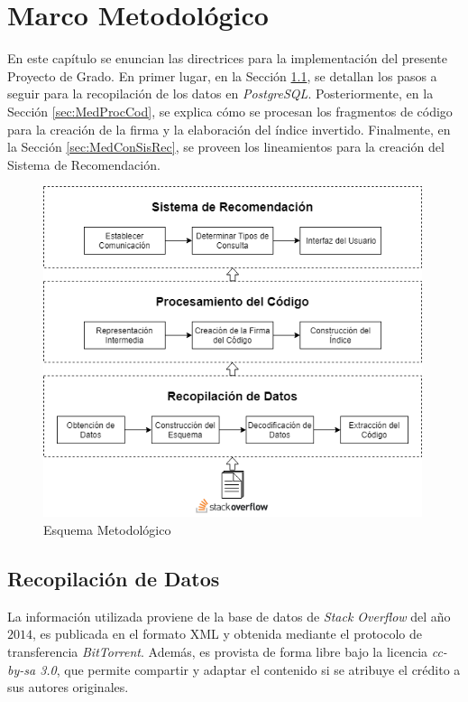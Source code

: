 \chapter{Marco Metodológico}

En este capítulo se enuncian las directrices para la implementación
del presente Proyecto de Grado.
En primer lugar, en la Sección \ref{sec:MedRecDat},
se detallan los pasos a seguir para la recopilación de los datos en \textit{PostgreSQL}.
Posteriormente, en la Sección \ref{sec:MedProcCod}, se explica cómo se procesan los fragmentos 
de código para la creación de la firma y la elaboración del índice invertido. 
Finalmente, en la Sección \ref{sec:MedConSisRec}, se proveen los lineamientos para la
creación del Sistema de Recomendación.


\begin{figure}[h]
\centering
\includegraphics[width=30em]{img/metodo.png}
\caption{Esquema Metodológico}
\label{fig:metodo}
\end{figure}

\section{Recopilación de Datos}
\label{sec:MedRecDat}

La información utilizada proviene de la base de
datos de \textit{Stack Overflow} del año $2014$,
es publicada en el formato \ac{XML} y
obtenida mediante el protocolo de transferencia \textit{BitTorrent}.
Además, es provista de forma libre bajo la licencia \textit{cc-by-sa 3.0},
que permite compartir y adaptar el contenido
si se atribuye el crédito a sus autores originales.

